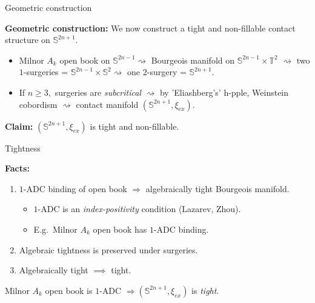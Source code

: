 \documentclass{beamer}
\begin{document}
\begin{frame}{Geometric construction}
    
    \textbf{Geometric construction:} We now construct a tight and non-fillable contact structure on $\mathbb S^{2n+1}$.
    
    \medskip
    
    \pause

    \begin{itemize}
        \item Milnor $A_k$ open book on $\mathbb S^{2n-1}\rightsquigarrow$ Bourgeois manifold on $\mathbb S^{2n-1}\times \mathbb T^2$
    $\rightsquigarrow $ two $1$-surgeries = $\mathbb S^{2n-1}\times \mathbb S^2 \rightsquigarrow$ one $2$-surgery = $\mathbb S^{2n+1}.$
    
    \medskip

    \pause
    
    \item If $n\geq 3,$ surgeries are \emph{subcritical} $\rightsquigarrow$ by 'Eliashberg's' h-pple, Weinstein cobordism $\rightsquigarrow$ contact manifold $(\mathbb S^{2n+1},\xi_{ex})$.

    \end{itemize}

    \pause
    
    \medskip

    \begin{tcolorbox}
    \textbf{Claim:} $(\mathbb S^{2n+1},\xi_{ex})$ is tight and non-fillable.
    \end{tcolorbox}
    
\end{frame}

\begin{frame}{Tightness}

\textbf{Facts:} \begin{enumerate}
    \item $1$-ADC binding of open book $\Rightarrow$  algebraically tight Bourgeois manifold.
    \pause
    \begin{itemize}
        \item  $1$-ADC is an \emph{index-positivity} condition (Lazarev, Zhou).
        \pause
        \item E.g.\ Milnor $A_k$ open book has $1$-ADC binding.
    \end{itemize}
    \pause
    \item Algebraic tightness is preserved under surgeries.
    \pause
    \item Algebraically tight $\implies$ tight.
\end{enumerate}

\pause

\vspace*{1cm}

\begin{tcolorbox}
    Milnor $A_k$ open book is $1$-ADC $\Rightarrow (\mathbb S^{2n+1},\xi_{ex})$ is \emph{tight}.
    \end{tcolorbox}

\end{frame}
\end{document}
